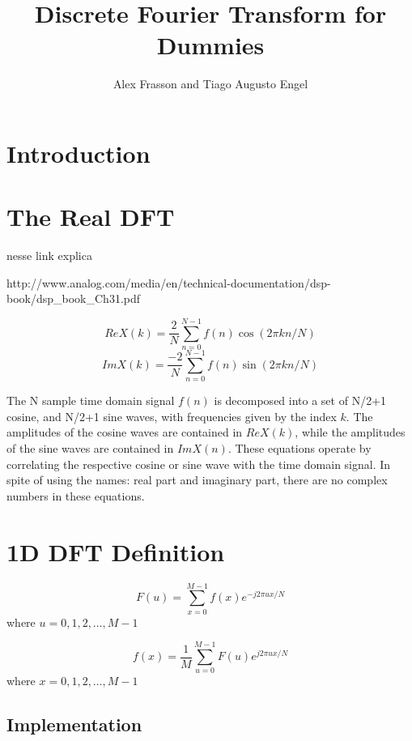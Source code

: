 \documentclass[12pt]{article}
\title{Discrete Fourier Transform for Dummies}
\author{Alex Frasson and Tiago Augusto Engel\inst{1}}
\begin{document}
 
\maketitle

\section{Introduction}

\section{The Real DFT}

nesse link explica 

http://www.analog.com/media/en/technical-documentation/dsp-book/dsp\_book\_Ch31.pdf

\begin{equation}
ReX(k)=\frac{2}{N} \sum_{n=0}^{N-1}f(n) \cos(2\pi kn/N)
\end{equation}
\begin{equation}
ImX(k)=\frac{-2}{N} \sum_{n=0}^{N-1}f(n) \sin(2\pi kn/N)
\end{equation}

The N sample time domain signal $f(n)$ is decomposed into a set of N/2+1 cosine, and N/2+1 sine waves, with frequencies given by the index $k$. The amplitudes of the cosine waves are contained in $ReX(k)$, while the amplitudes of the sine waves are contained in $ImX(n)$. These  equations operate by correlating the respective cosine or sine wave with the time domain signal.  In spite of using the names: real part and imaginary part, there are no complex  numbers in these equations\cite{Analog2016}.


\section{1D DFT Definition}
\begin{equation}
F(u)=\sum_{x=0}^{M-1}f(x) e^{-j 2\pi u x / N}
\end{equation}
where $u = 0,1,2,\dots, M-1$

\begin{equation}
f(x)=\frac{1}{M}\sum_{u=0}^{M-1}F(u) e^{j 2\pi u x / N}
\end{equation}
where $x = 0,1,2,\dots, M-1$

\subsection{Implementation}
\end{document}
